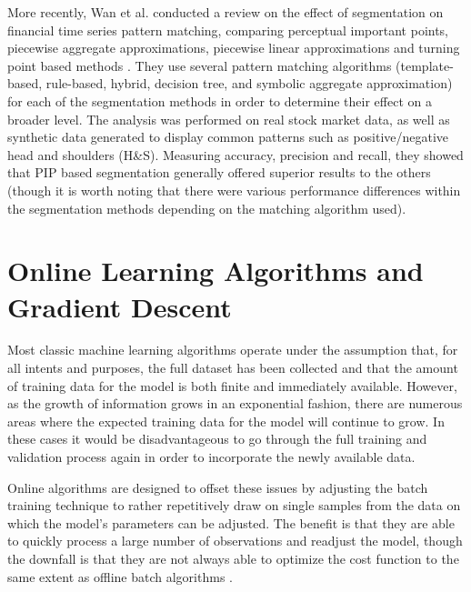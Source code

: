 \documentclass[a4paper,latin]{paper}
\begin{document}
More recently, Wan et al. conducted a review on the effect of segmentation on financial time series pattern 
matching, comparing perceptual important points, piecewise aggregate approximations, piecewise linear 
approximations and turning point based methods \cite{Wan}. They use several pattern matching algorithms 
(template-based, rule-based, hybrid, decision tree, and symbolic aggregate approximation) for each of the 
segmentation methods in order to determine their effect on a broader level. The analysis was performed on real 
stock market data, as well as synthetic data generated to display common patterns such as positive/negative 
head and shoulders (H\&S). Measuring accuracy, precision and recall, they showed that PIP based segmentation 
generally offered superior results to the others (though it is worth noting that there were various performance 
differences within the segmentation methods depending on the matching algorithm used).

\section{Online Learning Algorithms and Gradient Descent} \label{OGD}
\hfill

Most classic machine learning algorithms operate under the assumption that, for all intents and purposes, the 
full dataset has been collected and that the amount of training data for the model is both finite and immediately 
available. However, as the growth of information grows in an exponential fashion, there are numerous areas where
 the expected training data for the model will continue to grow. In these cases it would be disadvantageous to go 
 through the full training and validation process again in order to incorporate the newly available data.
\hfill\break

Online algorithms are designed to offset these issues by adjusting the batch training technique to rather 
repetitively draw on single samples from the data on which the model’s parameters can be adjusted. The benefit 
is that they are able to quickly process a large number of observations and readjust the model, though the 
downfall is that they are not always able to optimize the cost function to the same extent as offline batch 
algorithms \cite{Albers}.
\hfill\break
\end{document}
